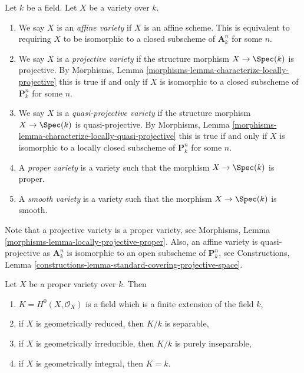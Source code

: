 \begin{definition}
\label{definition-variety-type}
Let $k$ be a field. Let $X$ be a variety over $k$.
\begin{enumerate}
\item We say $X$ is an {\it affine variety} if $X$ is an affine scheme.
This is equivalent to requiring $X$ to be isomorphic to a closed
subscheme of $\mathbf{A}^n_k$ for some $n$.
\item We say $X$ is a {\it projective variety} if the
structure morphism $X \to \Spec(k)$ is projective. By
Morphisms, Lemma \ref{morphisms-lemma-characterize-locally-projective}
this is true if and only if $X$ is isomorphic to a closed
subscheme of $\mathbf{P}^n_k$ for some $n$.
\item We say $X$ is a {\it quasi-projective variety} if
the structure morphism $X \to \Spec(k)$ is quasi-projective. By
Morphisms, Lemma \ref{morphisms-lemma-characterize-locally-quasi-projective}
this is true if and only if $X$ is isomorphic to a
locally closed subscheme of $\mathbf{P}^n_k$ for some $n$.
\item A {\it proper variety} is a variety such that the
morphism $X \to \Spec(k)$ is proper.
\item A {\it smooth variety} is a variety such that the
morphism $X \to \Spec(k)$ is smooth.
\end{enumerate}
\end{definition}

\noindent
Note that a projective variety is a proper variety, see
Morphisms, Lemma \ref{morphisms-lemma-locally-projective-proper}.
Also, an affine variety is quasi-projective as $\mathbf{A}^n_k$
is isomorphic to an open subscheme of $\mathbf{P}^n_k$, see
Constructions,
Lemma \ref{constructions-lemma-standard-covering-projective-space}.

\begin{lemma}
\label{lemma-regular-functions-proper-variety}
Let $X$ be a proper variety over $k$. Then
\begin{enumerate}
\item $K = H^0(X, \mathcal{O}_X)$ is a field which is
a finite extension of the field $k$,
\item if $X$ is geometrically reduced, then $K/k$ is separable,
\item if $X$ is geometrically irreducible, then $K/k$
is purely inseparable,
\item if $X$ is geometrically integral, then $K = k$.
\end{enumerate}
\end{lemma}

